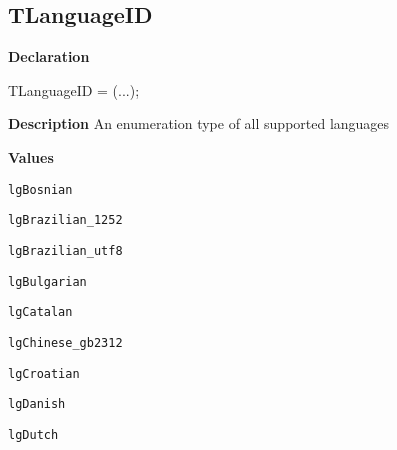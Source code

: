 \documentclass{report}
\newif\ifpdf
\begin{document}
\subsection*{TLanguageID}
\fi
\label{PasDoc_Languages-TLanguageID}
\begin{list}{}{
\setlength{\itemindent}{0cm}
\setlength{\listparindent}{0cm}
\setlength{\leftmargin}{\evensidemargin}
\addtolength{\leftmargin}{\tmplength}
\settowidth{\labelsep}{X}
\addtolength{\leftmargin}{\labelsep}
\setlength{\labelwidth}{\tmplength}
}
\item[\textbf{Declaration}\hfill]
\ifpdf
\begin{flushleft}
\fi
\begin{ttfamily}
TLanguageID = (...);\end{ttfamily}

\ifpdf
\end{flushleft}
\fi

\par
\item[\textbf{Description}]
An enumeration type of all supported languages\item[\textbf{Values}]
\begin{description}
\item[\texttt{lgBosnian}] \label{PasDoc_Languages-lgBosnian}
\index{}
 
\item[\texttt{lgBrazilian{\_}1252}] \label{PasDoc_Languages-lgBrazilian_1252}
\index{}
 
\item[\texttt{lgBrazilian{\_}utf8}] \label{PasDoc_Languages-lgBrazilian_utf8}
\index{}
 
\item[\texttt{lgBulgarian}] \label{PasDoc_Languages-lgBulgarian}
\index{}
 
\item[\texttt{lgCatalan}] \label{PasDoc_Languages-lgCatalan}
\index{}
 
\item[\texttt{lgChinese{\_}gb2312}] \label{PasDoc_Languages-lgChinese_gb2312}
\index{}
 
\item[\texttt{lgCroatian}] \label{PasDoc_Languages-lgCroatian}
\index{}
 
\item[\texttt{lgDanish}] \label{PasDoc_Languages-lgDanish}
\index{}
 
\item[\texttt{lgDutch}] \label{PasDoc_Languages-lgDutch}
\index{}
 

\end{description}
\end{list}
\end{document}
